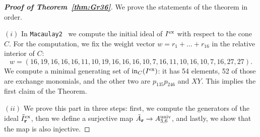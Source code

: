 \documentclass[pdftex]{sigma}%
\numberwithin{equation}{section}
\DeclareMathOperator{\init}{in}
\begin{document}
\begin{proof}[{\bf Proof of Theorem~\ref{thm:Gr36}}]
We prove the statements of the theorem in order.

 $(i)$ In \texttt{Macaulay2}~\cite{M2} we compute the initial ideal of $I^{\rm ex}$ with respect to the cone $C$.
 For the computation, we fix the weight vector $w=r_1+\dots+r_{16}$ in the relative interior of $C$:
 \begin{displaymath}
 w= (16, 19, 16, 16, 16, 11, 10, 19, 16, 16, 16, 10, 7, 16, 11, 10, 16, 10, 7, 16, 27, 27).
 \end{displaymath}
 We compute a minimal generating set of $\init_C(I^{\rm ex})$: it has 54 elements, 52 of those are exchange monomials, and the other two are $p_{135}p_{246}$ and $XY$.
 This implies the first claim of the Theorem.


$(ii)$ We prove this part in three steps: first, we compute the generators of the ideal $\tilde I_{\bf r}^{\rm ex}$, then we define a surjective map $\tilde A_{\bf r}\to A_{3,6}^{\rm univ}$, and lastly, we show that the map is also injective.


\end{proof}
\end{document}
